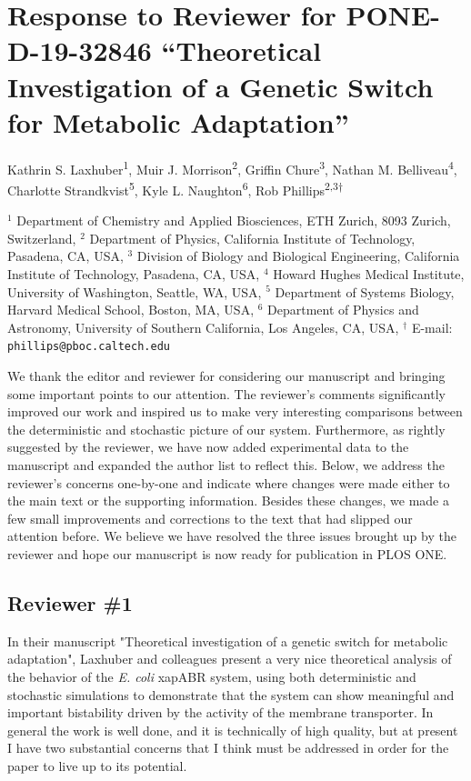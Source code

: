 \documentclass[11pt,letterpaper]{article}
\begin{document}
\section*{Response to Reviewer for PONE-D-19-32846 ``Theoretical Investigation of a Genetic Switch for Metabolic Adaptation''}
Kathrin S. Laxhuber\textsuperscript{1},
Muir J. Morrison\textsuperscript{2},
Griffin Chure\textsuperscript{3},
Nathan M. Belliveau\textsuperscript{4},
Charlotte Strandkvist\textsuperscript{5},
Kyle L. Naughton\textsuperscript{6},
Rob Phillips\textsuperscript{2,3$\dagger$}
\vspace{10pt}

\noindent\tiny{
$^1$ Department of Chemistry and Applied Biosciences, ETH Zurich, 8093 Zurich, Switzerland,
$^2$ Department of Physics, California Institute of Technology, Pasadena, CA, USA,
$^3$ Division of Biology and Biological Engineering, California Institute of Technology, Pasadena, CA, USA,
$^4$ Howard Hughes Medical Institute, University of Washington, Seattle, WA, USA,
$^5$ Department of Systems Biology, Harvard Medical School, Boston, MA, USA,
$^6$ Department of Physics and Astronomy, University of Southern California, Los Angeles, CA, USA, $^\dagger$ E-mail: \texttt{phillips@pboc.caltech.edu}}

\begin{responseSummary}
We thank the editor and reviewer for considering our manuscript and
bringing some important points to our attention. The reviewer's comments
significantly improved our work and inspired us to make very interesting
comparisons between the deterministic and stochastic picture of our
system. Furthermore, as rightly suggested by the reviewer, we have now
added experimental data to the manuscript and expanded the author list
to reflect this. Below, we address the reviewer's concerns one-by-one
and indicate where changes were made either to the main text or the
supporting information. Besides these changes, we made a few small
improvements and corrections to the text that had slipped our attention before. We
believe we have resolved the three issues brought up by the reviewer and
hope our manuscript is now ready for publication in PLOS ONE.
\end{responseSummary}

\subsection*{Reviewer \#1}
\begin{review}
In their manuscript "Theoretical investigation of a genetic switch for
metabolic adaptation", Laxhuber and colleagues present a very nice
theoretical analysis of the behavior of the \emph{E. coli} xapABR system, using
both deterministic and stochastic simulations to demonstrate that the
system can show meaningful and important bistability driven by the
activity of the membrane transporter. In general the work is well done,
and it is technically of high quality, but at present I have two
substantial concerns that I think must be addressed in order for the
paper to live up to its potential.
\end{review}
\end{document}
